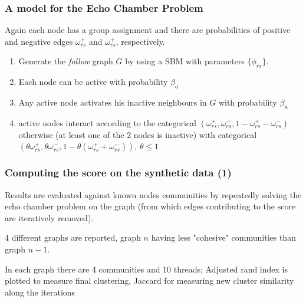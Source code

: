 \documentclass{beamer}
\begin{document}
\begin{frame}[c]
	\frametitle{A model for the Echo Chamber Problem}
	Again each node has a group assignment and there are probabilities of
	positive and negative edges $\omega _{rs}^{+}  $ and $\omega _{rs}^{+}  $,
	respectively.

	\begin{enumerate}
		\item Generate the \emph{follow} graph $G$ by using a SBM with parameters
		      $\{ \phi _{rs}  \}$.
		\item Each node can be active with probability $\beta_{a}  $
		\item Any active node activates his inactive neighbours in $G$ with
		      probability $\beta_n$
		\item active nodes interact according to the categorical $(\omega _{rs}
			      ^{+}, \omega _{rs} ^{-}, 1 - \omega _{rs} ^{+} - \omega _{rs} ^{-})
		      $ otherwise (at least one of the 2 nodes is inactive) with
		      categorical $(\theta \omega _{rs} ^{+}, \theta \omega _{rs} ^{-}, 1
			      - \theta (\omega _{rs} ^{+} + \omega _{rs} ^{-}))$, $\theta \leq 1$
	\end{enumerate}

\end{frame}
\begin{frame}[c]
	\frametitle{Computing the score on the synthetic data (1)}
	Results are evaluated against known nodes communities by repeatedly solving the echo
	chamber problem on the graph (from which edges contributing to the score
	are iteratively removed).

    4 different graphs are reported, graph $n$ having less "cohesive"
    communities than graph $n-1$.

    \bigskip

    In each graph there are 4 communities and 10 threads; Adjusted rand index
    is plotted to measure final clustering, Jaccard for measuring new cluster
    similarity along the iterations
\end{frame}
\end{document}
